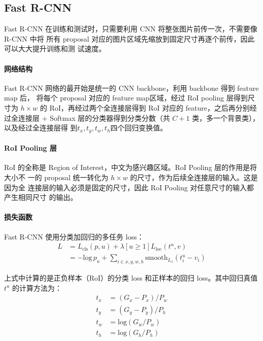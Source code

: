 \subsection{Fast R-CNN}
\label{subsec:Fast-R-CNN}

Fast R-CNN 在训练和测试时，只需要利用 CNN 将整张图片前传一次，不需要像 R-CNN 中将
所有 proposal 对应的图片区域先缩放到固定尺寸再逐个前传，因此可以大大提升训练和测
试速度。

\paragraph{网络结构}
Fast R-CNN 网络的最开始是统一的 CNN backbone，利用 backbone 得到 feature map 后，
将每个 proposal 对应的 feature map区域，经过 RoI pooling 层得到尺寸为 $h \times
w$ 的 RoI，再经过两个全连接层得到 RoI 对应的 feature，之后再分别经过全连接层 +
Softmax 层的分类器得到分类分数（共 $C+1$ 类，多一个背景类），以及经过全连接层得
到$t_x, t_y, t_w, t_h$四个回归变换值。

\paragraph{RoI Pooling 层}
RoI 的全称是 Region of Interest，中文为感兴趣区域。RoI Pooling 层的作用是将大小不
一的 proposal 统一转化为 $h \times w$ 的尺寸，作为后续全连接层的输入。这是因为全
连接层的输入必须是固定的尺寸，因此 RoI Pooling 对任意尺寸的输入都产生相同尺寸
的输出。

\paragraph{损失函数}
Fast R-CNN 使用分类加回归的多任务 loss：
\begin{align}
  L & = L_{\mathrm{cls}}(p, u) + \lambda [u \geq 1] L_{\mathrm{loc}}(t^u, v) \\
    & = -\mathrm{log}\,p_u + \sum_{i \in {x, y, w, h}} \mathrm{smooth}_{L_1}(t_i^u - v_i)
\end{align}

上式中计算的是正负样本（RoI）的分类 loss 和正样本的回归 loss。其中回归真值 $t^u$
的计算方法为：
\begin{align}
  t_x & = (G_x - P_x) / P_w \\
  t_y & = (G_y - P_y) / P_h \\
  t_w & = \mathrm{log} (G_w/P_w) \\
  t_h & = \mathrm{log} (G_h/P_h)
\end{align}

